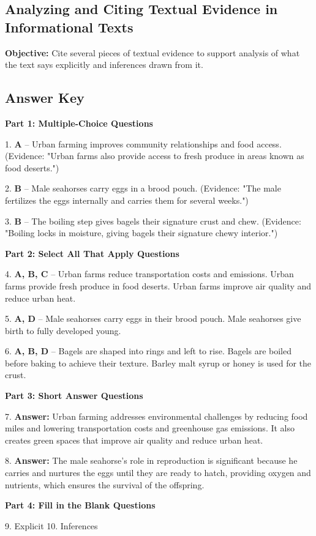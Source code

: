 \documentclass[12pt]{article}
\begin{document}
\subsection*{Analyzing and Citing Textual Evidence in Informational Texts}
\onehalfspacing

\begin{tcolorbox}[colframe=black!40, colback=gray!0, title=Learning Objective]
\textbf{Objective:} Cite several pieces of textual evidence to support analysis of what the text says explicitly and inferences drawn from it.
\end{tcolorbox}


\subsection*{Answer Key}

\textbf{Part 1: Multiple-Choice Questions}

1. \textbf{A} – Urban farming improves community relationships and food access.  
(Evidence: "Urban farms also provide access to fresh produce in areas known as food deserts.")

2. \textbf{B} – Male seahorses carry eggs in a brood pouch.  
(Evidence: "The male fertilizes the eggs internally and carries them for several weeks.")

3. \textbf{B} – The boiling step gives bagels their signature crust and chew.  
(Evidence: "Boiling locks in moisture, giving bagels their signature chewy interior.")

\textbf{Part 2: Select All That Apply Questions}

4. \textbf{A, B, C} – Urban farms reduce transportation costs and emissions.  
Urban farms provide fresh produce in food deserts.  
Urban farms improve air quality and reduce urban heat.

5. \textbf{A, D} – Male seahorses carry eggs in their brood pouch.  
Male seahorses give birth to fully developed young.

6. \textbf{A, B, D} – Bagels are shaped into rings and left to rise.  
Bagels are boiled before baking to achieve their texture.  
Barley malt syrup or honey is used for the crust.

\textbf{Part 3: Short Answer Questions}

7. \textbf{Answer:} Urban farming addresses environmental challenges by reducing food miles and lowering transportation costs and greenhouse gas emissions. It also creates green spaces that improve air quality and reduce urban heat.

8. \textbf{Answer:} The male seahorse’s role in reproduction is significant because he carries and nurtures the eggs until they are ready to hatch, providing oxygen and nutrients, which ensures the survival of the offspring.

\textbf{Part 4: Fill in the Blank Questions}

9. Explicit  
10. Inferences  
\end{document}

